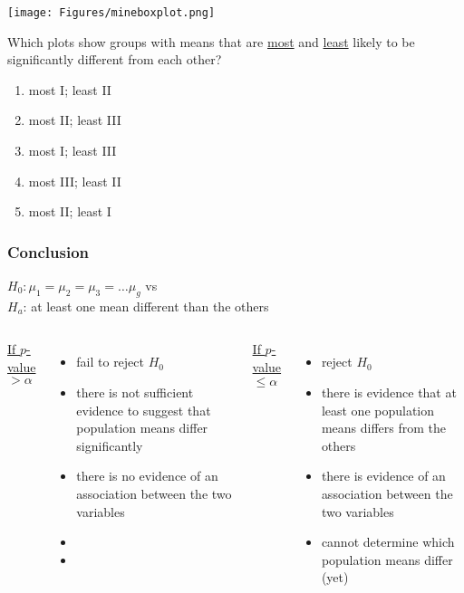 \begin{frame}
\begin{center}
\texttt{[image: Figures/mineboxplot.png]}
\end{center}
\begin{clicker}{Which plots show groups with means that are \underline{most} and \underline{least} likely to be significantly different from each other?}
\begin{enumerate}
    \item
    most I; least II
    \item
    most II; least III
    \item
    most I; least III
    \item
    most III; least II
    \item
    most II; least I
\end{enumerate}
\end{clicker}
\end{frame}

\begin{frame}
\frametitle{Conclusion}
$H_0: \mu_1=\mu_2=\mu_3=\ldots \mu_g$ vs \\
$H_a$: at least one mean different than the others
\vskip15pt
\begin{columns}
\underline{If $p$-value $>\alpha$}
\begin{itemize}
    \item
    fail to reject $H_0$
    \item
    there is not sufficient evidence to suggest that population means differ significantly
    \item
    there is no evidence of an association between the two variables
    \item[]
    \item[]
\end{itemize}
\underline{If $p$-value $\leq\alpha$}
\begin{itemize}
    \item
    reject $H_0$
    \item
    there is evidence that at least one population means differs from the others
    \item
    there is evidence of an association between the two variables
    \item
    cannot determine which population means differ (yet)
\end{itemize}
\end{columns}
\end{frame}

